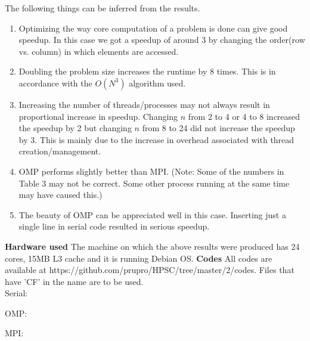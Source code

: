 \documentclass{article}
\begin{document}
The following things can be inferred from the results.
\begin{enumerate}
	\item  Optimizing the way core computation of a problem is done can give good speedup. In this case we got a speedup of around 3 by changing the order(row vs. column) in which elements are accessed.    
	\item Doubling the problem size increases the runtime by 8 times. This is in accordance with the $O(N^3)$ algorithm used.
	\item Increasing the number of threads/processes may not always result in proportional increase in speedup. Changing $n$ from 2 to 4 or 4 to 8 increased the speedup by 2 but changing $n$ from 8 to 24 did not increase the speedup by 3. This is mainly due to the increase in overhead associated with thread creation/management.
	\item OMP performs slightly better than MPI. (Note: Some of the numbers in Table 3 may not be correct. Some other process running at the same time may have caused this.)
	\item The beauty of OMP can be appreciated well in this case. Inserting just a single line in serial code resulted in serious speedup.

\end{enumerate}

\textbf{Hardware used}
The machine on which the above results were produced has 24 cores, 15MB L3 cache and it is running Debian OS.
\newpage
\textbf{Codes}
All codes are available at https://github.com/prupro/HPSC/tree/master/2/codes. Files that have 'CF' in the name are to be used. \\
Serial:

\newpage
OMP:

\newpage
MPI:

\end{document}
